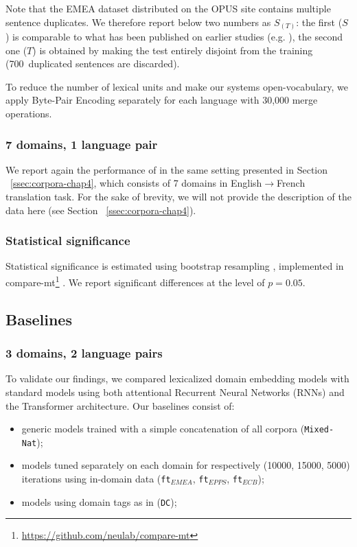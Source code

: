 Note that the EMEA dataset distributed on the OPUS site contains multiple sentence duplicates. 
We therefore report below two numbers as $S_{(T)}$: the first ($S$) is comparable to what has been published on earlier studies (e.g. \citet{Zeng18multidomain}), the second one ($T$) is obtained by making the test entirely disjoint from the training (700~duplicated sentences are discarded).

To reduce the number of lexical units and make our systems open-vocabulary, we apply Byte-Pair Encoding \citep{Sennrich16neural} separately for each language with 30,000 merge operations.
\subsubsection{7 domains, 1 language pair}
We report again the performance of  in the same setting presented in Section ~\ref{ssec:corpora-chap4}, which consists of 7 domains in English$\rightarrow$French translation task. For the sake of brevity, we will not provide the description of the data here (see Section ~\ref{ssec:corpora-chap4}).

\subsubsection{Statistical significance}
Statistical significance is estimated using bootstrap resampling \citep{Koehn04statistical}, implemented in compare-mt\footnote{\url{https://github.com/neulab/compare-mt}} \citep{Neubig19compare-mt}. We report significant differences at the level of $p=0.05$.

\subsection{Baselines \label{ssec:baselines-chap5}}
\subsubsection{3 domains, 2 language pairs}
To validate our findings, we compared lexicalized domain embedding models with standard models using both attentional Recurrent Neural Networks (RNNs) and the Transformer architecture. Our baselines consist of:
\begin{itemize}
\item generic models trained with a simple concatenation of all corpora (\texttt{Mixed-Nat});
\item models tuned separately on each domain for respectively (10000, 15000, 5000) iterations using in-domain data (\texttt{ft$_{EMEA}$}, \texttt{ft$_{EPPS}$}, \texttt{ft$_{ECB}$}); 
\item models using domain tags as in \citet{Kobus17domain} (\texttt{DC}); 
\end{itemize}


